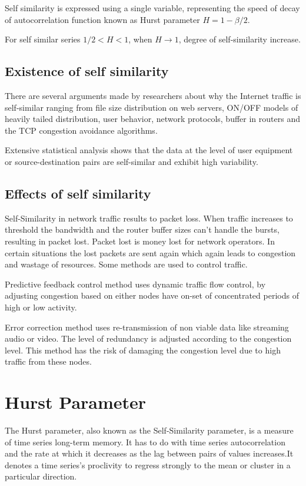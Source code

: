 Self similarity is expressed using a single variable, representing the speed of decay of autocorrelation function known as Hurst parameter $H=1-\beta/2$.

For self similar series $1/2<H<1$, when $H\to1$, degree of self-similarity increase. 

\subsection{Existence of self similarity}

There are several arguments made by researchers about why the Internet traffic is self-similar ranging from file size distribution on  web servers, ON/OFF models of heavily tailed distribution, user behavior, network protocols, buffer in routers and the TCP congestion avoidance algorithms.

Extensive statistical analysis shows that the data at the
level of user equipment or source-destination pairs are self-similar and exhibit high variability.

\subsection{Effects of self similarity}

Self-Similarity in network traffic results to packet loss. When traffic
increases  to threshold the bandwidth and the router buffer sizes can't handle the bursts, resulting in packet lost. Packet lost is money lost for network operators. In certain situations the lost packets are sent again which again leads to congestion and wastage of resources. Some methods are used to control traffic.

Predictive feedback control method uses dynamic traffic flow control, by adjusting congestion based on either nodes have on-set of concentrated periods of high or low activity.

Error correction method uses re-transmission of non viable data like streaming audio or video. The level of redundancy is adjusted according to the congestion level. This method has the risk of damaging the congestion level due to high traffic from these nodes.

\section{Hurst Parameter}
The Hurst parameter, also known as the Self-Similarity parameter, is a measure of time series long-term memory. It has to do with time series autocorrelation and the rate at which it decreases as the lag between pairs of values increases.It denotes a time series's proclivity to regress strongly to the mean or cluster in a particular direction.

